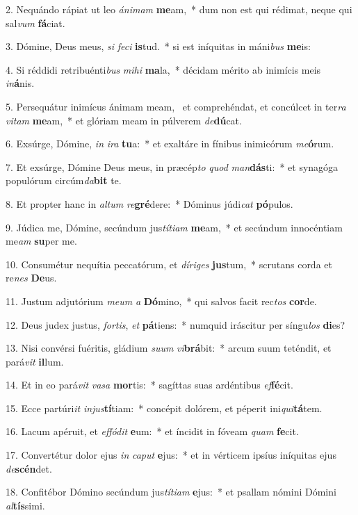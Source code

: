 2. Nequándo rápiat ut leo \textit{á}\textit{ni}\textit{mam} \textbf{me}am,~*  dum non est qui rédimat, neque qui sal\textit{vum} \textbf{fá}ciat.\

3. Dómine, Deus meus, \textit{si} \textit{fe}\textit{ci} \textbf{is}tud.~*  si est iníquitas in máni\textit{bus} \textbf{me}is:\

4. Si réddidi retribuénti\textit{bus} \textit{mi}\textit{hi} \textbf{ma}la,~*  décidam mérito ab inimícis meis \textit{in}\textbf{á}nis.\

5. Persequátur inimícus ánimam meam, \dag\  et comprehéndat, et concúlcet in ter\textit{ra} \textit{vi}\textit{tam} \textbf{me}am,~*  et glóriam meam in púlverem \textit{de}\textbf{dú}cat.\

6. Exsúrge, Dómine, \textit{in} \textit{i}\textit{ra} \textbf{tu}a:~*  et exaltáre in fínibus inimicórum \textit{me}\textbf{ó}rum.\

7. Et exsúrge, Dómine Deus meus, in præcép\textit{to} \textit{quod} \textit{man}\textbf{dás}ti:~*  et synagóga populórum circúm\textit{da}\textbf{bit} te.\

8. Et propter hanc in \textit{al}\textit{tum} \textit{re}\textbf{gré}dere:~*  Dóminus júdi\textit{cat} \textbf{pó}pulos.\

9. Júdica me, Dómine, secúndum jus\textit{tí}\textit{ti}\textit{am} \textbf{me}am,~*  et secúndum innocéntiam me\textit{am} \textbf{su}per me.\

10. Consumétur nequítia peccatórum, et \textit{dí}\textit{ri}\textit{ges} \textbf{jus}tum,~*  scrutans corda et re\textit{nes} \textbf{De}us.\

11. Justum adjutórium \textit{me}\textit{um} \textit{a} \textbf{Dó}mino,~*  qui salvos facit rec\textit{tos} \textbf{cor}de.\

12. Deus judex justus, \textit{for}\textit{tis}, \textit{et} \textbf{pá}tiens:~*  numquid iráscitur per síngu\textit{los} \textbf{di}es?\

13. Nisi convérsi fuéritis, gládium \textit{su}\textit{um} \textit{vi}\textbf{brá}bit:~*  arcum suum teténdit, et pará\textit{vit} \textbf{il}lum.\

14. Et in eo pará\textit{vit} \textit{va}\textit{sa} \textbf{mor}tis:~*  sagíttas suas ardéntibus \textit{ef}\textbf{fé}cit.\

15. Ecce partúri\textit{it} \textit{in}\textit{jus}\textbf{tí}tiam:~*  concépit dolórem, et péperit ini\textit{qui}\textbf{tá}tem.\

16. Lacum apéruit, et \textit{ef}\textit{fó}\textit{dit} \textbf{e}um:~*  et íncidit in fóveam \textit{quam} \textbf{fe}cit.\

17. Convertétur dolor ejus \textit{in} \textit{ca}\textit{put} \textbf{e}jus:~*  et in vérticem ipsíus iníquitas ejus \textit{de}\textbf{scén}det.\

18. Confitébor Dómino secúndum jus\textit{tí}\textit{ti}\textit{am} \textbf{e}jus:~*  et psallam nómini Dómini \textit{al}\textbf{tís}simi.\

